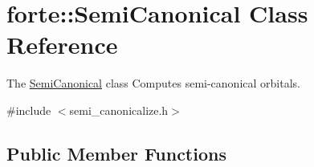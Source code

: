 \hypertarget{classforte_1_1_semi_canonical}{}\section{forte\+:\+:Semi\+Canonical Class Reference}
\label{classforte_1_1_semi_canonical}


The \mbox{\hyperlink{classforte_1_1_semi_canonical}{Semi\+Canonical}} class Computes semi-\/canonical orbitals.  




{\ttfamily \#include $<$semi\+\_\+canonicalize.\+h$>$}

\subsection*{Public Member Functions}
